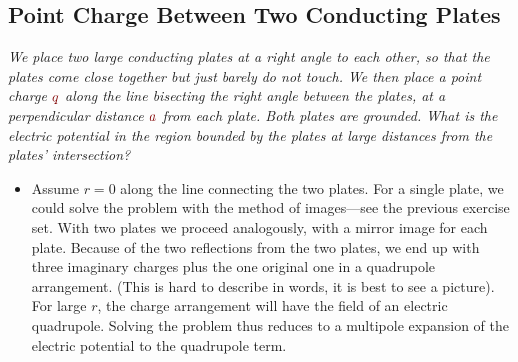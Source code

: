 \documentclass[11pt, a4paper]{article}
\newcommand{\dmath}[1]{\textcolor{Maroon}{#1}}  %
\begin{document}
\subsection{Point Charge Between Two Conducting Plates}
\textit{We place two large conducting plates at a right angle to each other, so that the plates come close together but just barely do not touch. We then place a point charge $ \dmath{q} $ along the line bisecting the right angle between the plates, at a perpendicular distance $ \dmath{a} $ from each plate. Both plates are grounded. What is the electric potential in the region bounded by the plates at large distances from the plates' intersection?}
\begin{itemize}
	\item Assume $ r = 0 $ along the line connecting the two plates. For a single plate, we could solve the problem with the method of images---see the previous exercise set. With two plates we proceed analogously, with a mirror image for each plate. Because of the two reflections from the two plates, we end up with three imaginary charges plus the one original one in a quadrupole arrangement. (This is hard to describe in words, it is best to see a picture). For large $ r $, the charge arrangement will have the field of an electric quadrupole. Solving the problem thus reduces to a multipole expansion of the electric potential to the quadrupole term.  
\end{itemize}	
	
\end{document}
